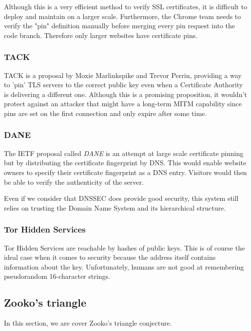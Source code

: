 \documentclass{vldb}
\begin{document}
Although this is a very efficient method to verify SSL certificates, it is difficult to deploy and maintain on a larger scale. Furthermore, the Chrome team needs to verify the "pin" definition manually before merging every pin request into the code branch. Therefore only larger websites have certificate pins.

\subsubsection{TACK}

TACK is a proposal by Moxie Marlinkspike and Trevor Perrin, providing a way to 'pin' TLS servers to the correct public key even when a Certificate Authority is delivering a different one. Although this is a promising proposition, it wouldn't protect against an attacker that might have a long-term MITM capability since pins are set on the first connection and only expire after some time.\cite{tackMITM}

\subsubsection{DANE}

The IETF proposal called \emph{DANE} is an attempt at large scale certificate pinning but by distributing the certificate fingerprint by DNS. This would enable website owners to specify their certificate fingerprint as a DNS entry. Visitors would then be able to verify the authenticity of the server.

Even if we consider that DNSSEC does provide good security, this system still relies on trusting the Domain Name System and its hierarchical structure.

\subsubsection{Tor Hidden Services}

Tor Hidden Services are reachable by hashes of public keys. This is of course the ideal case when it comes to security because the address itself contains information about the key. Unfortunately, humans are not good at remembering pseudorandom 16-character strings.

\subsection{Zooko's triangle}
In this section, we are cover Zooko's triangle conjecture.
\end{document}
